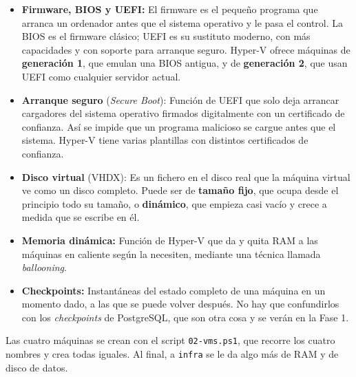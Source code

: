 \documentclass[11pt, a4paper, titlepage]{article}
\newcommand{\cod}[1]{\texttt{#1}}
\begin{document}
\begin{itemize}
    \item \textbf{Firmware, BIOS y UEFI:} El firmware es el pequeño programa que arranca un ordenador antes que el sistema operativo y le pasa el control. La BIOS es el firmware clásico; UEFI es su sustituto moderno, con más capacidades y con soporte para arranque seguro. Hyper-V ofrece máquinas de \textbf{generación 1}, que emulan una BIOS antigua, y de \textbf{generación 2}, que usan UEFI como cualquier servidor actual.
    \item \textbf{Arranque seguro} (\textit{Secure Boot}): Función de UEFI que solo deja arrancar cargadores del sistema operativo firmados digitalmente con un certificado de confianza. Así se impide que un programa malicioso se cargue antes que el sistema. Hyper-V tiene varias plantillas con distintos certificados de confianza.
    \item \textbf{Disco virtual} (VHDX): Es un fichero en el disco real que la máquina virtual ve como un disco completo. Puede ser de \textbf{tamaño fijo}, que ocupa desde el principio todo su tamaño, o \textbf{dinámico}, que empieza casi vacío y crece a medida que se escribe en él.
    \item \textbf{Memoria dinámica:} Función de Hyper-V que da y quita RAM a las máquinas en caliente según la necesiten, mediante una técnica llamada \textit{ballooning}.
    \item \textbf{Checkpoints:} Instantáneas del estado completo de una máquina en un momento dado, a las que se puede volver después. No hay que confundirlos con los \textit{checkpoints} de PostgreSQL, que son otra cosa y se verán en la Fase 1.
\end{itemize}

Las cuatro máquinas se crean con el script \cod{02-vms.ps1}, que recorre los cuatro nombres y crea todas iguales. Al final, a \cod{infra} se le da algo más de RAM y de disco de datos.
\end{document}
